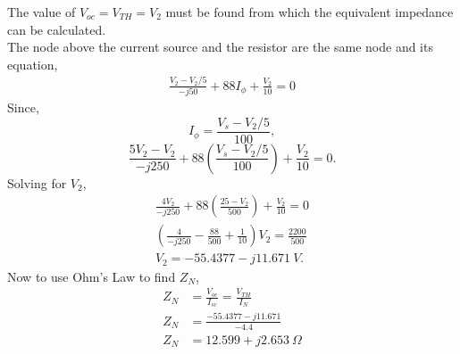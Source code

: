 \documentclass[12pt]{article}
\begin{document}
    The value of $V_{oc} = V_{TH} = V_2$ must be found from which the equivalent
    impedance can be calculated.
    \\
    The node above the current source and the resistor are the same node and its
    equation,
    \begin{gather*}
        \frac{V_2 - V_2 / 5}{-j 50} + 88 I_{\phi} + \frac{V_2}{10} = 0
    \end{gather*}
    Since,
    \[
        I_{\phi} = \frac{V_{s}- V_2 / 5}{100}
    ,\]
    \[
        \frac{5V_2 - V_2}{-j 250} + 88 \left( \frac{V_{s}-V_2 / 5}{100} \right)
        + \frac{V_2}{10} = 0
    .\]
    Solving for $V_2$,
    \begin{gather*}
        \frac{4V_2}{-j 250} + 88 \left( \frac{25 - V_2}{500} \right) +
        \frac{V_2}{10} = 0 \\
        \left( \frac{4}{-j 250} - \frac{88}{500} + \frac{1}{10} \right) V_2 =
        \frac{2200}{500} \\
        V_2 = -55.4377 - j 11.671\ V.
    \end{gather*}
    Now to use Ohm's Law to find $Z_{N}$,
    \begin{align*}
        Z_{N} &= \frac{V_{oc}}{I_{sc}} = \frac{V_{TH}}{I_N} \\
        Z_{N} &= \frac{-55.4377- j 11.671}{-4.4} \\
        Z_{N} &= \boxed{12.599 + j 2.653\ \Omega}
    \end{align*}
\end{document}
